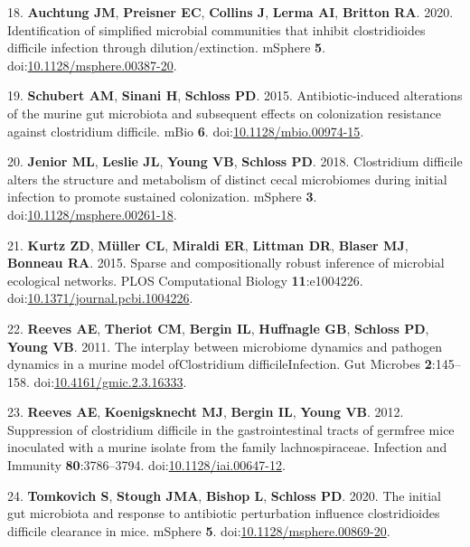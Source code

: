 \documentclass[11pt,]{article}
\newlength{\cslhangindent}
\newenvironment{cslreferences}%
  {\setlength{\parindent}{0pt}%
  \everypar{\setlength{\hangindent}{\cslhangindent}}\ignorespaces}%
  {\par}
\begin{document}
\begin{cslreferences}
\leavevmode\hypertarget{ref-auchtung2020}{}%
18. \textbf{Auchtung JM}, \textbf{Preisner EC}, \textbf{Collins J},
\textbf{Lerma AI}, \textbf{Britton RA}. 2020. Identification of
simplified microbial communities that inhibit clostridioides difficile
infection through dilution/extinction. mSphere \textbf{5}.
doi:\href{https://doi.org/10.1128/msphere.00387-20}{10.1128/msphere.00387-20}.

\leavevmode\hypertarget{ref-schubert2015}{}%
19. \textbf{Schubert AM}, \textbf{Sinani H}, \textbf{Schloss PD}. 2015.
Antibiotic-induced alterations of the murine gut microbiota and
subsequent effects on colonization resistance against clostridium
difficile. mBio \textbf{6}.
doi:\href{https://doi.org/10.1128/mbio.00974-15}{10.1128/mbio.00974-15}.

\leavevmode\hypertarget{ref-jenior2018}{}%
20. \textbf{Jenior ML}, \textbf{Leslie JL}, \textbf{Young VB},
\textbf{Schloss PD}. 2018. Clostridium difficile alters the structure
and metabolism of distinct cecal microbiomes during initial infection to
promote sustained colonization. mSphere \textbf{3}.
doi:\href{https://doi.org/10.1128/msphere.00261-18}{10.1128/msphere.00261-18}.

\leavevmode\hypertarget{ref-kurtz2015}{}%
21. \textbf{Kurtz ZD}, \textbf{Müller CL}, \textbf{Miraldi ER},
\textbf{Littman DR}, \textbf{Blaser MJ}, \textbf{Bonneau RA}. 2015.
Sparse and compositionally robust inference of microbial ecological
networks. PLOS Computational Biology \textbf{11}:e1004226.
doi:\href{https://doi.org/10.1371/journal.pcbi.1004226}{10.1371/journal.pcbi.1004226}.

\leavevmode\hypertarget{ref-reeves2011}{}%
22. \textbf{Reeves AE}, \textbf{Theriot CM}, \textbf{Bergin IL},
\textbf{Huffnagle GB}, \textbf{Schloss PD}, \textbf{Young VB}. 2011. The
interplay between microbiome dynamics and pathogen dynamics in a murine
model ofClostridium difficileInfection. Gut Microbes
\textbf{2}:145--158.
doi:\href{https://doi.org/10.4161/gmic.2.3.16333}{10.4161/gmic.2.3.16333}.

\leavevmode\hypertarget{ref-reeves2012}{}%
23. \textbf{Reeves AE}, \textbf{Koenigsknecht MJ}, \textbf{Bergin IL},
\textbf{Young VB}. 2012. Suppression of clostridium difficile in the
gastrointestinal tracts of germfree mice inoculated with a murine
isolate from the family lachnospiraceae. Infection and Immunity
\textbf{80}:3786--3794.
doi:\href{https://doi.org/10.1128/iai.00647-12}{10.1128/iai.00647-12}.

\leavevmode\hypertarget{ref-tomkovich2020}{}%
24. \textbf{Tomkovich S}, \textbf{Stough JMA}, \textbf{Bishop L},
\textbf{Schloss PD}. 2020. The initial gut microbiota and response to
antibiotic perturbation influence clostridioides difficile clearance in
mice. mSphere \textbf{5}.
doi:\href{https://doi.org/10.1128/msphere.00869-20}{10.1128/msphere.00869-20}.


\end{cslreferences}
\end{document}

